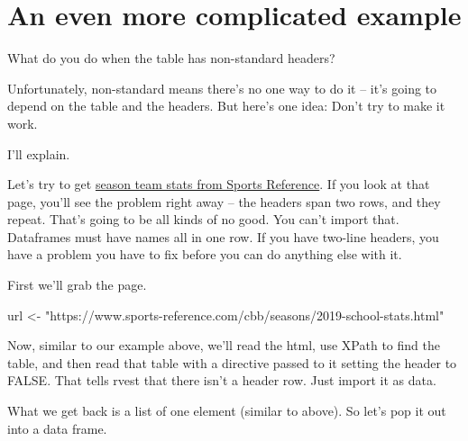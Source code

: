\documentclass[]{book}
\newenvironment{Shaded}{\begin{snugshade}}{\end{snugshade}}
\newcommand{\DataTypeTok}[1]{\textcolor[rgb]{0.13,0.29,0.53}{#1}}
\newcommand{\KeywordTok}[1]{\textcolor[rgb]{0.13,0.29,0.53}{\textbf{#1}}}
\newcommand{\NormalTok}[1]{#1}
\newcommand{\OperatorTok}[1]{\textcolor[rgb]{0.81,0.36,0.00}{\textbf{#1}}}
\newcommand{\OtherTok}[1]{\textcolor[rgb]{0.56,0.35,0.01}{#1}}
\newcommand{\StringTok}[1]{\textcolor[rgb]{0.31,0.60,0.02}{#1}}
\begin{document}
\hypertarget{an-even-more-complicated-example}{%
\section{An even more complicated example}\label{an-even-more-complicated-example}}

What do you do when the table has non-standard headers?

Unfortunately, non-standard means there's no one way to do it -- it's going to depend on the table and the headers. But here's one idea: Don't try to make it work.

I'll explain.

Let's try to get \href{https://www.sports-reference.com/cbb/seasons/2019-school-stats.html}{season team stats from Sports Reference}. If you look at that page, you'll see the problem right away -- the headers span two rows, and they repeat. That's going to be all kinds of no good. You can't import that. Dataframes must have names all in one row. If you have two-line headers, you have a problem you have to fix before you can do anything else with it.

First we'll grab the page.

\begin{Shaded}
\begin{Highlighting}[]
\NormalTok{url <-}\StringTok{ "https://www.sports-reference.com/cbb/seasons/2019-school-stats.html"}
\end{Highlighting}
\end{Shaded}

Now, similar to our example above, we'll read the html, use XPath to find the table, and then read that table with a directive passed to it setting the header to FALSE. That tells rvest that there isn't a header row. Just import it as data.

\begin{Shaded}
\end{Shaded}

What we get back is a list of one element (similar to above). So let's pop it out into a data frame.
\end{document}
